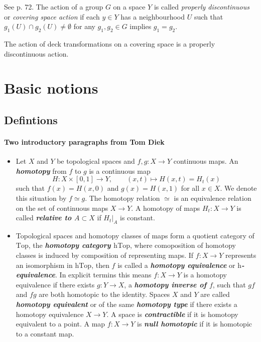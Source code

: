 \begin{definition}
\label{definition-properly-discontinuous-action}
See \cite{hat} p. 72. The action of a group $G$ on a space $Y$ is called 
{\it properly discontinuous} or {\it covering space action} if each $y \in Y$
has a neighbourhood $U$ such that $g_1(U) \cap g_2(U)\neq \emptyset$ for any
$g_1,g_2 \in G$ implies $g_1=g_2$.
\end{definition}

\begin{proposition}
\label{proposition-deck-transformations-act-properly-discontinuous}
The action of deck transformations on a covering space is a properly
discontinuous action.
\end{proposition}

\section{Basic notions}\label{sec:Basic notions}
\subsection{Defintions}
\paragraph{Two introductory paragraphs from Tom Diek}
\begin{itemize}
	\item Let $X$ and $Y$ be topological spaces and $f,g:X\to Y$ continuous maps. An \textbf{\textit{homotopy}} from $f$ to $g$ is a continuous map
		$$H:X\times[0,1]\to Y,\qquad(x,t)\mapsto H(x,t)=H_t(x)$$
		such that $f(x)=H(x,0)$ and $g(x)=H(x,1)$ for all $x\in X$. We denote this situation by $f\simeq g$. The homotopy relation $\simeq$ is an equivalence relation on the set of continuous maps $X\to Y$. A homotopy of maps $H_t:X\to Y$ is called \textbf{\textit{relative to $A\subset X$}} if $H_t|_A$ is constant.
		
		
\item Topological spaces and homotopy classes of maps form a quotient category
of $\text{Top}$, the \textbf{\textit{homotopy category $\text{hTop}$}}, where comoposition
of homotopy classes is induced by composition of representing maps. If $f:X\to
Y$ represents an isomorphism in $\text{hTop}$, then $f$ is called a
\textbf{\textit{homotopy equivalence}} or
\textbf{\textit{$\text{h}$-equivalence}}. In explicit termins this means $f:X\to
Y$ is a homotopy equivalence if there exists $g:Y\to X$, a
\textbf{\textit{homotopy inverse of $f$}}, such that $gf$ and $fg$ are both
homotopic to the identity. Spaces $X$ and $Y$ are called
\textbf{\textit{homotopy equivalent}} or of the same \textbf{\textit{homotopy
type}} if there exists a homotopy equivalence $X\to Y$. A space is
\textbf{\textit{contractible}} if it is homotopy equivalent to a point. A map
$f:X\to Y$ is \textbf{\textit{null homotopic}} if it is homotopic to a constant
map.

\end{itemize}

